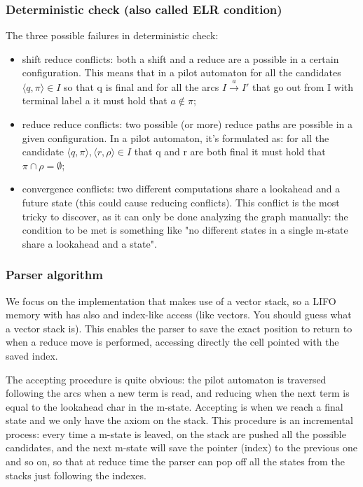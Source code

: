 			\subsubsection{Deterministic check (also called ELR condition)}	
				The three possible failures in deterministic check:
				\begin{itemize}
					\item shift reduce conflicts: both a shift and a reduce are a possible in a certain configuration. This means that in a pilot automaton for all 
					the candidates $\langle q, \pi \rangle \in I$ so that q is final and for all the arcs $I \xrightarrow{a} I'$ that go out from I with terminal 
					label a it must hold that $a \notin \pi$;
					\item reduce reduce conflicts: two possible (or more) reduce paths are possible in a given configuration. In a pilot automaton, it's formulated 
					as: for all the candidate $\langle q, \pi \rangle, \langle r, \rho \rangle \in I$ that q and r are both final it must hold that 
					$\pi \cap \rho = \emptyset$;
					\item convergence conflicts: two different computations share a lookahead and a future state (this could cause reducing conflicts). This conflict 
					is the most tricky to discover, as it can only be done analyzing the graph manually: the condition to be met is something like "no different 
					states in a single m-state share a lookahead and a state".
				\end{itemize}
				
			\subsubsection{Parser algorithm}
				We focus on the implementation that makes use of a vector stack, so a LIFO memory with has also and index-like access (like vectors. You should guess 
				what a vector stack is). This enables the parser to save the exact position to return to when a reduce move is performed, accessing directly the cell 
				pointed with the saved index.

				The accepting procedure is quite obvious: the pilot automaton is traversed following the arcs when a new term is read, and reducing when the next term 
				is equal to the lookahead char in the m-state. Accepting is when we reach a final state and we only have the axiom on the stack. This procedure is an 
				incremental process: every time a m-state is leaved, on the stack are pushed all the possible candidates, and the next m-state will save the pointer 
				(index) to the previous one and so on, so that at reduce time the parser can pop off all the states from the stacks just following the indexes.

